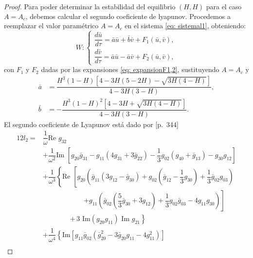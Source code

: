 \documentclass[]{article}
\theoremstyle{remark}
\begin{document}
\begin{proof}
		\noindent Para poder determinar la estabilidad del equilibrio $(H,H)$ para el caso $A=A_c$, debemos calcular el segundo coeficiente de lyapunov. Procedemos a reemplazar el valor paramétrico $A=A_c$ en el sistema \eqref{eq: sistemal1}, obteniendo:
		\begin{equation}
			W:
			\begin{cases}
				\dfrac{d\bar{u}}{d \tau} = \bar{a}\bar{u} + \bar{b}\bar{v} + F_1(\bar{u}, \bar{v}), \\[5pt]
				\dfrac{d\bar{v}}{d \tau} = \bar{a}\bar{u} - \bar{a}\bar{v} + F_2(\bar{u}, \bar{v}),
			\end{cases}
			\label{eq: normalFormWn}
		\end{equation}
		con $F_{1}$ y $F_2$ dadas por las expansiones \eqref{eq: expansionF1,2}, sustituyendo $A=A_c$ y
		\begin{equation*}
			\begin{aligned}
				\bar{a} &= \dfrac{H^3(1 - H)[4 - 3H(5 - 2H) - \sqrt{3H(4 - H)}]}{4 - 3H(3 - H)}, \\
				\bar{b} &= -\dfrac{H^3(1 - H)^2[4 - 3H + \sqrt{3H(4 - H)}]}{4 - 3H(3 - H)}.
			\end{aligned}
		\end{equation*}
		El segundo coeficiente de Lyapunov está dado por \cite{kuznetsov}[p.~344]
		\begin{equation}
			\begin{aligned}
				12l_2 = {} & \dfrac{1}{\omega} \text{Re } g_{32} \\
				& + \dfrac{1}{\omega^2} \text{Im } \left[ g_{20} \bar{g}_{31} - g_{11} (4 g_{31} + 3 \bar{g}_{22}) - \dfrac{1}{3} g_{02} (g_{40} + \bar{g}_{13}) - g_{30} g_{12} \right] \\
				& + \dfrac{1}{\omega^3} \left\{ \text{Re } \left[ g_{20} \left( \bar{g}_{11} (3 g_{12} - \bar{g}_{30}) + g_{02} \left( \bar{g}_{12} - \dfrac{1}{3} g_{30} \right) + \dfrac{1}{3} \bar{g}_{02} g_{03} \right) \right.\right. \\
				& \qquad\qquad\qquad \left. + g_{11} \left( \bar{g}_{02} \left( \dfrac{5}{3} \bar{g}_{30} + 3 g_{12} \right) + \dfrac{1}{3} g_{02} \bar{g}_{03} - 4 g_{11} g_{30} \right) \right] \\
				& \qquad\qquad \left. + \, 3 \text{ Im}(g_{20} g_{11}) \text{ Im } g_{21} \right\} \\
				& + \dfrac{1}{\omega^4} \left\{ \text{Im} \left[ g_{11} \bar{g}_{02} \left( \bar{g}_{20}^2 - 3 \bar{g}_{20} g_{11} - 4 g_{11}^2 \right) \right] \right. \\

\end{aligned}
\end{equation}
\end{proof}
\end{document}
